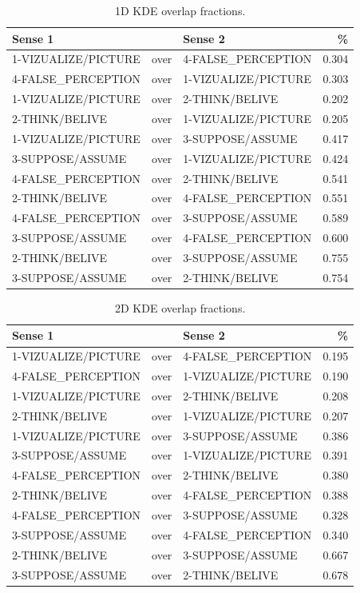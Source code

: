 \documentclass[
]{article}
\begin{document}
\begin{table}[H]
\centering
\caption{\label{tab:unnamed-chunk-12}1D KDE overlap fractions.\label{tab:kde1dfrac}}
\centering
\begin{tabular}[t]{lllr}
\toprule
Sense 1 &  & Sense 2 & \%\\
\midrule
1-VIZUALIZE/PICTURE & over & 4-FALSE\_PERCEPTION & 0.304\\
4-FALSE\_PERCEPTION & over & 1-VIZUALIZE/PICTURE & 0.303\\
1-VIZUALIZE/PICTURE & over & 2-THINK/BELIVE & 0.202\\
2-THINK/BELIVE & over & 1-VIZUALIZE/PICTURE & 0.205\\
1-VIZUALIZE/PICTURE & over & 3-SUPPOSE/ASSUME & 0.417\\
3-SUPPOSE/ASSUME & over & 1-VIZUALIZE/PICTURE & 0.424\\
4-FALSE\_PERCEPTION & over & 2-THINK/BELIVE & 0.541\\
2-THINK/BELIVE & over & 4-FALSE\_PERCEPTION & 0.551\\
4-FALSE\_PERCEPTION & over & 3-SUPPOSE/ASSUME & 0.589\\
3-SUPPOSE/ASSUME & over & 4-FALSE\_PERCEPTION & 0.600\\
2-THINK/BELIVE & over & 3-SUPPOSE/ASSUME & 0.755\\
3-SUPPOSE/ASSUME & over & 2-THINK/BELIVE & 0.754\\
\bottomrule
\end{tabular}
\end{table}

\begin{table}[H]
\centering
\caption{\label{tab:unnamed-chunk-13}2D KDE overlap fractions.\label{tab:kde2dfrac}}
\centering
\begin{tabular}[t]{lllr}
\toprule
Sense 1 &  & Sense 2 & \%\\
\midrule
1-VIZUALIZE/PICTURE & over & 4-FALSE\_PERCEPTION & 0.195\\
4-FALSE\_PERCEPTION & over & 1-VIZUALIZE/PICTURE & 0.190\\
1-VIZUALIZE/PICTURE & over & 2-THINK/BELIVE & 0.208\\
2-THINK/BELIVE & over & 1-VIZUALIZE/PICTURE & 0.207\\
1-VIZUALIZE/PICTURE & over & 3-SUPPOSE/ASSUME & 0.386\\
3-SUPPOSE/ASSUME & over & 1-VIZUALIZE/PICTURE & 0.391\\
4-FALSE\_PERCEPTION & over & 2-THINK/BELIVE & 0.380\\
2-THINK/BELIVE & over & 4-FALSE\_PERCEPTION & 0.388\\
4-FALSE\_PERCEPTION & over & 3-SUPPOSE/ASSUME & 0.328\\
3-SUPPOSE/ASSUME & over & 4-FALSE\_PERCEPTION & 0.340\\
2-THINK/BELIVE & over & 3-SUPPOSE/ASSUME & 0.667\\
3-SUPPOSE/ASSUME & over & 2-THINK/BELIVE & 0.678\\
\bottomrule
\end{tabular}
\end{table}
\end{document}
